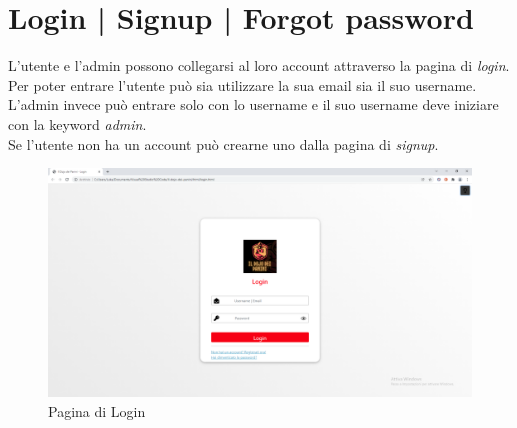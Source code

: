\documentclass[a4paper,12pt]{report}
\begin{document}
	
	\newpage
	
	\section{Login | Signup | Forgot password}
	
	\textsf{\small L'utente e l'admin possono collegarsi al loro account attraverso la pagina di \emph{login}.}
	\textsf{\small Per poter entrare l'utente può sia utilizzare la sua email sia il suo username.}\\
	\textsf{\small L'admin invece può entrare solo con lo username e il suo username deve iniziare con la keyword \emph{admin}.}\\
	\textsf{\small Se l'utente non ha un account può crearne uno dalla pagina di \emph{signup}.}
	
	\begin{figure}[H] 
		\centering
		\includegraphics[width=1\textwidth, height=1\textheight, keepaspectratio]{./Images/Login.png}
		\caption{Pagina di Login}
		\label{fig:login}
	\end{figure}
	
\end{document}
